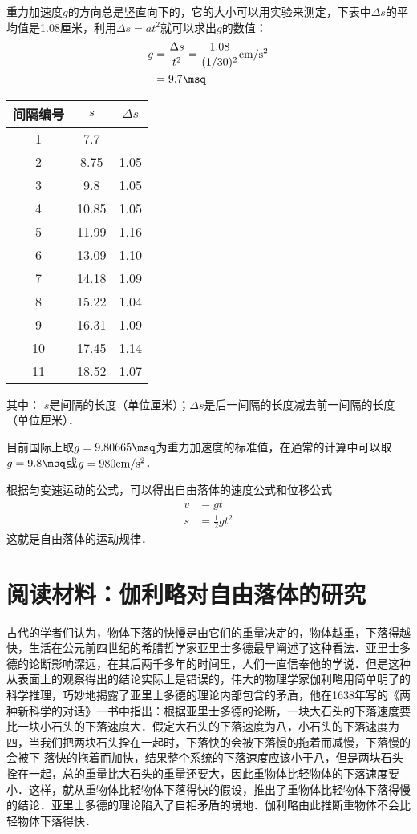 重力加速度$g$的方向总是竖直向下的，它的大小可以用实验来测定，下表中$\Delta s$的平均值是1.08厘米，利用$\Delta s=at^2$就可以求出$g$的数值：
\[\begin{split}
g&=\frac{\Delta s}{t^2}=\frac{1.08}{(1/30)^2}{\rm cm/s^2}\\
&=9.7\msq
\end{split} \]

\begin{center}
\begin{tabular}{ccc}
	\hline
间隔编号&
$s$&$\Delta s$
 \\\hline
	1&	7.7&	\\
	2&	8.75&	1.05
\\
	3&	9.8&	1.05
\\
	4&	10.85&	1.05
\\
	5&	11.99&	1.16
\\
	6&	13.09&	1.10
\\
	7&	14.18&	1.09
\\
	8&	15.22&	1.04
\\
	9&	16.31&	1.09
\\
	10&	17.45&	1.14
\\
	11&	18.52&	1.07\\\hline
\end{tabular}

其中：	$s$是间隔的长度（单位厘米）；$\Delta s$是后一间隔的长度减去前一间隔的长度（单位厘米）．
\end{center}



目前国际上取$g=9.80665\msq$为重力加速度的标准值，在通常的计算中可以取$g=9.8\msq$或$g=980{\rm cm/s^2}$．

根据匀变速运动的公式，可以得出自由落体的速度公式和位移公式
\[\begin{split}
v&=gt\\
s&=\frac{1}{2}gt^2
\end{split}\]
这就是自由落体的运动规律．


\section*{阅读材料：伽利略对自由落体的研究}
古代的学者们认为，物体下落的快慢是由它们的重量决定的，物体越重，下落得越快，生活在公元前四世纪的希腊哲学家亚里士多德最早阐述了这种看法．亚里士多德的论断影响深远，在其后两千多年的时间里，人们一直信奉他的学说．但是这种从表面上的观察得出的结论实际上是错误的，伟大的物理学家伽利略用简单明了的科学推理，巧妙地揭露了亚里士多德的理论内部包含的矛盾，他在1638年写的《两种新科学的对话》一书中指出：根据亚里士多德的论断，一块大石头的下落速度要比一块小石头的下落速度大．假定大石头的下落速度为八，小石头的下落速度为四，当我们把两块石头拴在一起时，下落快的会被下落慢的拖着而减慢，下落慢的会被下
落快的拖着而加快，结果整个系统的下落速度应该小于八，但是两块石头拴在一起，总的重量比大石头的重量还要大，因此重物体比轻物体的下落速度要小．这样，就从重物体比轻物体下落得快的假设，推出了重物体比轻物体下落得慢的结论．亚里士多德的理论陷入了自相矛盾的境地．伽利略由此推断重物体不会比轻物体下落得快．

